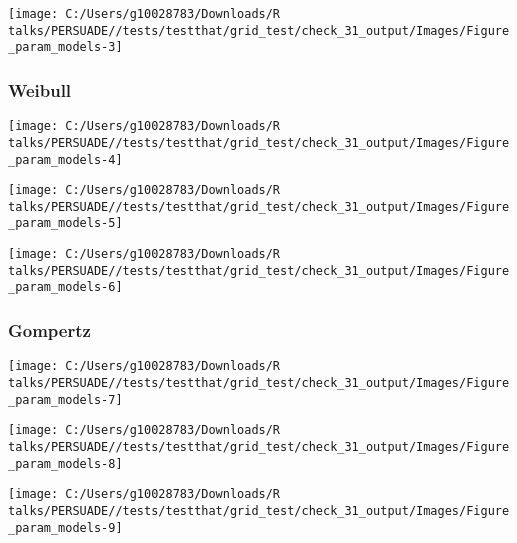 \documentclass[
]{article}
\begin{document}
\begin{flushleft}\texttt{[image: C:/Users/g10028783/Downloads/R talks/PERSUADE//tests/testthat/grid\_test/check\_31\_output/Images/Figure\_param\_models-3]} \end{flushleft}

\clearpage

\subsubsection{Weibull}\label{weibull}

\begin{flushleft}\texttt{[image: C:/Users/g10028783/Downloads/R talks/PERSUADE//tests/testthat/grid\_test/check\_31\_output/Images/Figure\_param\_models-4]} \end{flushleft}

\begin{flushleft}\texttt{[image: C:/Users/g10028783/Downloads/R talks/PERSUADE//tests/testthat/grid\_test/check\_31\_output/Images/Figure\_param\_models-5]} \end{flushleft}

\begin{flushleft}\texttt{[image: C:/Users/g10028783/Downloads/R talks/PERSUADE//tests/testthat/grid\_test/check\_31\_output/Images/Figure\_param\_models-6]} \end{flushleft}

\clearpage

\subsubsection{Gompertz}\label{gompertz}

\begin{flushleft}\texttt{[image: C:/Users/g10028783/Downloads/R talks/PERSUADE//tests/testthat/grid\_test/check\_31\_output/Images/Figure\_param\_models-7]} \end{flushleft}

\begin{flushleft}\texttt{[image: C:/Users/g10028783/Downloads/R talks/PERSUADE//tests/testthat/grid\_test/check\_31\_output/Images/Figure\_param\_models-8]} \end{flushleft}

\begin{flushleft}\texttt{[image: C:/Users/g10028783/Downloads/R talks/PERSUADE//tests/testthat/grid\_test/check\_31\_output/Images/Figure\_param\_models-9]} \end{flushleft}
\end{document}
